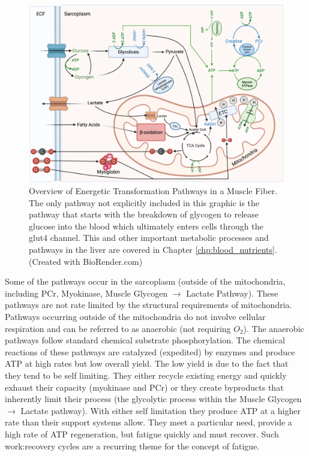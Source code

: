 \begin{figure}[!h]
    \centering
    \includegraphics[width=1\linewidth]{./figure/Energetics_Overview.png}
    \caption{Overview of Energetic Transformation Pathways in a Muscle Fiber. The only pathway not explicitly included in this graphic is the pathway that starts with the breakdown of glycogen to release glucose into the blood which ultimately enters cells through the glut4 channel. This and other important metabolic processes and pathways in the liver are covered in Chapter \ref{chp:blood_nutrients}. (\footnotesize{Created with BioRender.com})}
    \label{fig:Energetics_Overview}
\end{figure}

Some of the pathways occur in the sarcoplasm (outside of the mitochondria, including PCr, Myokinase, Muscle Glycogen $\rightarrow$ Lactate Pathway). These pathways are not rate limited by the structural requirements of mitochondria.  Pathways occurring outside of the mitochondria do not involve cellular respiration and can be referred to as anaerobic (not requiring $O_2$). The anaerobic pathways follow standard chemical substrate phosphorylation. The chemical reactions of these pathways are catalyzed (expedited) by enzymes and produce ATP at high rates but low overall yield. The low yield is due to the fact that they tend to be self limiting. They either recycle existing energy and quickly exhaust their capacity (myokinase and PCr) or they create byproducts that inherently limit their process (the glycolytic process within the Muscle Glycogen $\rightarrow$ Lactate pathway). With either self limitation they produce ATP at a higher rate than their support systems allow. They meet a particular need, provide a high rate of ATP regeneration, but fatigue quickly and must recover. Such work:recovery cycles are a recurring theme for the concept of fatigue.

